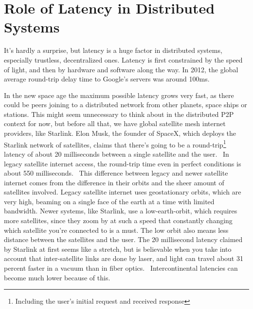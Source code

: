 \section{Role of Latency in Distributed Systems}
It's hardly a surprise, but latency is a huge factor in distributed systems, especially trustless, decentralized ones. Latency is first constrained by the speed of light, and then by hardware and software along the way. In 2012, the global average round-trip delay time to Google's servers was around 100ms.~\cite{Grigorik_undated-mc}

In the new space age the maximum possible latency grows very fast, as there could be peers joining to a distributed network from other planets, space ships or stations. This might seem unnecessary to think about in the distributed P2P context for now, but before all that, we have global satellite mesh internet providers, like Starlink. Elon Musk, the founder of SpaceX, which deploys the Starlink network of satellites, claims that there's going to be a round-trip\footnote{Including the user's initial request and received response} latency of about 20 milliseconds between a single satellite and the user.~\cite{Tung_undated-ny} In legacy satellite internet access, the round-trip time even in perfect conditions is about 550 milliseconds.~\cite{noauthor_undated-zc} This difference between legacy and newer satellite internet comes from the difference in their orbits and the sheer amount of satellites involved. Legacy satellite internet uses geostationary orbits, which are very high, beaming on a single face of the earth at a time with limited bandwidth. Newer systems, like Starlink, use a low-earth-orbit, which requires more satellites, since they zoom by at such a speed that constantly changing which satellite you're connected to is a must. The low orbit also means less distance between the satellites and the user. The 20 millisecond latency claimed by Starlink at first seems like a stretch, but is believable when you take into account that inter-satellite links are done by laser, and light can travel about 31 percent faster in a vacuum than in fiber optics.~\cite{Finley2013-wt} Intercontinental latencies can become much lower because of this.

